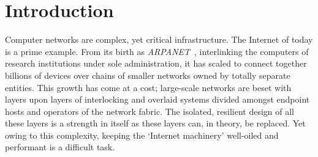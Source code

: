 \chapter{Introduction}\label{chap:intro}


Computer networks are complex, yet critical infrastructure.
The Internet of today is a prime example.
From its birth as \emph{ARPANET}~\parencite{DBLP:conf/afips/HeartKOCW70}, interlinking the computers of research institutions under sole administration, it has scaled to connect together billions of devices over chains of smaller networks owned by totally separate entities.
This growth has come at a cost; large-scale networks are beset with layers upon layers of interlocking and overlaid systems divided amongst endpoint hosts and operators of the network fabric.
The isolated, resilient design of all these layers is a strength in itself as these layers can, in theory, be replaced.
Yet owing to this complexity, keeping the `Internet machinery' well-oiled and performant is a difficult task.

